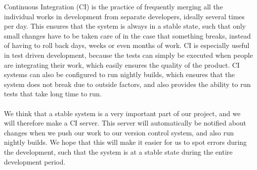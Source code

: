 Continuous Integration (CI) is the practice of frequently merging all the individual works in development from separate developers, ideally several times per day. This ensures that the system is always in a stable state, such that only small changes have to be taken care of in the case that something breaks, instead of having to roll back days, weeks or even months of work. CI is especially useful in test driven development, because the tests can simply be executed when people are integrating their work, which easily ensures the quality of the product. CI systems can also be configured to run nightly builds, which ensures that the system does not break due to outside factors, and also provides the ability to run tests that take long time to run.
\\\\
We think that a stable system is a very important part of our project, and we will therefore make a CI server. This server will automatically be notified about changes when we push our work to our version control system, and also run nightly builds. We hope that this will make it easier for us to spot errors during the development, such that the system is at a stable state during the entire development period. 